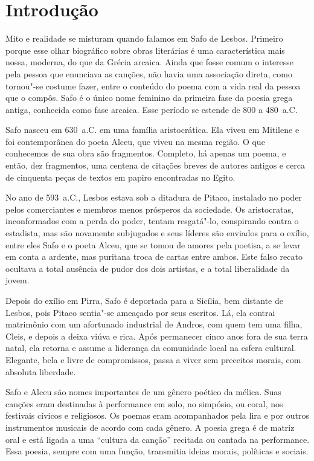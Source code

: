 \documentclass[12pt]{extarticle}
\begin{document}
\tableofcontents


\section{Introdução}
Mito e realidade se misturam quando falamos em Safo de Lesbos. Primeiro porque
esse olhar biográfico sobre obras literárias é uma característica mais nossa,
moderna, do que da Grécia arcaica. Ainda que fosse comum o interesse pela pessoa
que enunciava as canções, não havia uma associação direta, como tornou"-se costume
fazer, entre o conteúdo do poema com a vida real da pessoa que o compôs.
Safo é o único nome feminino da primeira fase da poesia grega antiga, conhecida 
como fase arcaica. Esse período se estende de 800 a 480~a.C.

Safo nasceu em 630~a.C. em uma família aristocrática. Ela viveu em Mitilene e foi 
contemporânea do poeta Alceu, que viveu na mesma região. O que conhecemos de sua
obra são fragmentos. Completo, há apenas um poema, e então, dez fragmentos, uma centena 
de citações breves de autores antigos e cerca de cinquenta peças de textos em papiro
encontradas no Egito.

No ano de 593~a.C., Lesbos estava sob a ditadura de Pitaco, instalado no poder pelos 
comerciantes e membros menos prósperos da sociedade. Os aristocratas, inconformados 
com a perda do poder, tentam resgatá"-lo, conspirando contra o estadista, mas são 
novamente subjugados e seus líderes são enviados para o exílio, entre eles Safo e 
o poeta Alceu, que se tomou de amores pela poetisa, a se levar em conta a ardente, 
mas puritana troca de cartas entre ambos. Este falso recato ocultava a total ausência 
de pudor dos dois artistas, e a total liberalidade da jovem.

Depois do exílio em Pirra, Safo é deportada para a Sicília, bem distante de Lesbos, 
pois Pitaco sentia"-se ameaçado por seus escritos. Lá, ela contrai matrimônio com um 
afortunado industrial de Andros, com quem tem uma filha, Cleis, e depois a deixa 
viúva e rica. Após permanecer cinco anos fora de sua terra natal, ela retorna e 
assume a liderança da comunidade local na esfera cultural. Elegante, bela e livre 
de compromissos, passa a viver sem preceitos morais, com absoluta liberdade.

Safo e Alceu são nomes importantes de um gênero poético da mélica. Suas canções 
eram destinadas à performance em solo, no simpósio, ou coral, nos festivais cívicos 
e religiosos. Os poemas eram acompanhados pela lira e por outros instrumentos musicais 
de acordo com cada gênero. A poesia grega é de matriz oral e está ligada a uma 
``cultura da canção'' recitada ou cantada na performance. Essa poesia, sempre com uma 
função, transmitia ideias morais, políticas e sociais.
\end{document}
